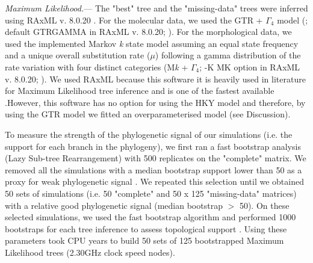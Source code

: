\documentclass[12pt,letterpaper]{article}
\renewcommand{\subsubsection}[1]{%
\vspace{2ex}
\noindent
\textit{#1.}---}
\begin{document}
\subsubsection{Maximum Likelihood}
The "best" tree and the "missing-data" trees were inferred using RAxML v. 8.0.20 \citep{Stamatakis21012014}. For the molecular data, we used the GTR + $\Gamma_4$ model (\citealt{tavare1986}; default GTRGAMMA in RAxML v. 8.0.20; \citealt{Stamatakis21012014}). For the morphological data, we used the implemented Markov \textit{k} state model \citep{lewisa2001} assuming an equal state frequency and a unique overall substitution rate ($\mu$) following a gamma distribution of the rate variation with four distinct categories (M\textit{k} + $\Gamma_4$; -K MK option in RAxML v. 8.0.20; \citealt{Stamatakis21012014}).
We used RAxML because this software it is heavily used in literature for Maximum Likelihood tree inference \citep[][e.g.]{rouresite-specific2011,Bogdanowicz2012,springermacroevolutionary2012,O'Leary08022013,kellymolecular2014} and is one of the fastest available \citep{Stamatakis01102008}.However, this software has no option for using the HKY model and therefore, by using the GTR model we fitted an overparameterised model (see Discussion).

To measure the strength of the phylogenetic signal of our simulations (i.e. the support for each branch in the phylogeny),
we first ran a fast bootstrap analysis (Lazy Sub-tree Rearrangement) with 500 replicates on the "complete" matrix. We removed all the simulations with a median bootstrap support lower than 50 as a proxy for weak phylogenetic signal \citep{zanderminimal2004}. We repeated this selection until we obtained 50 sets of simulations (i.e. 50 "complete" and 50 x 125 "missing-data" matrices) with a relative good phylogenetic signal (median bootstrap $>$ 50). On these selected simulations, we used the fast bootstrap algorithm and performed 1000 bootstraps for each tree inference to assess topological support \citep{pattengale2010many}. Using these parameters took  CPU years to build 50 sets of 125 bootstrapped Maximum Likelihood trees (2.30GHz clock speed nodes).
\end{document}
